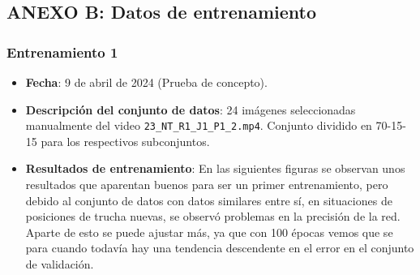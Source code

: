\subsection*{ANEXO B: Datos de entrenamiento}
\label{subsec:B}
\subsubsection*{Entrenamiento 1}
\label{train:1}
\begin{itemize}
    \item \textbf{Fecha}: 9 de abril de 2024 (Prueba de concepto).
    \item \textbf{Descripción del conjunto de datos}: 24 imágenes seleccionadas manualmente del video \verb|23_NT_R1_J1_P1_2.mp4|. Conjunto dividido en 70-15-15 para los respectivos subconjuntos.
    \item \textbf{Resultados de entrenamiento}: En las siguientes figuras se observan  unos resultados que aparentan buenos  para ser un primer entrenamiento, pero debido al conjunto de datos con datos similares entre sí, en 
    situaciones de posiciones de trucha nuevas, se observó problemas en la precisión de la red. Aparte de esto se puede ajustar más, ya que con 100 épocas vemos que se para cuando todavía hay una tendencia 
    descendente en el error en el conjunto de validación.
    

\end{itemize}

